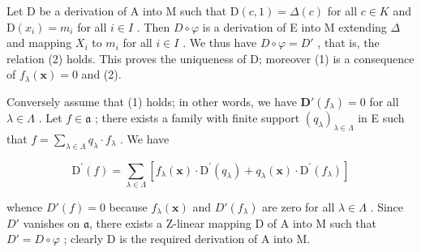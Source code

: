 Let D be a derivation of A into M such that \(\mathrm{D}(c,1)=\Delta(c)\) for all \(c\in K\) and \(\mathrm{D}(x_{i})=m_{i}\) for all \(i\in I\) . Then \(D\circ\varphi\) is a derivation of E into M extending \(\Delta\) and mapping \(X_{i}\) to \(m_{i}\) for all \(i\in I\) . We thus have \(D\circ\varphi=D'\) , that is, the relation (2) holds. This proves the uniqueness of D; moreover (1) is a consequence of \(f_{\lambda}(\mathbf{x})=0\) and (2).

Conversely assume that (1) holds; in other words, we have \(\mathbf{D}'(f_{\lambda}) = 0\) for all \(\lambda \in \Lambda\) . Let \(f \in \mathfrak{a}\) ; there exists a family with finite support \((q_{\lambda})_{\lambda \in \Lambda}\) in E such that \(f = \sum_{\lambda \in \Lambda} q_{\lambda} \cdot f_{\lambda}\) . We have

\[
\mathrm{D} ^ {\prime} (f) = \sum_ {\lambda \in \Lambda} \left[ f _ {\lambda} (\mathbf {x}) \cdot \mathrm{D} ^ {\prime} (q _ {\lambda}) + q _ {\lambda} (\mathbf {x}) \cdot \mathrm{D} ^ {\prime} (f _ {\lambda}) \right]
\]

whence \(D'(f) = 0\) because \(f_{\lambda}(\mathbf{x})\) and \(D'(f_{\lambda})\) are zero for all \(\lambda \in \Lambda\) . Since \(D'\) vanishes on \(\mathfrak{a}\), there exists a Z-linear mapping D of A into M such that \(D' = D \circ \varphi\) ; clearly D is the required derivation of A into M.

